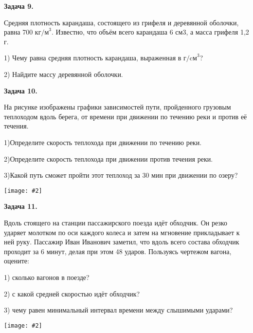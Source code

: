 \documentclass{article}
\newcommand{\pdt}[1]{
	\par
	\begin{minipage}{.95\linewidth}
	\setlength{\parindent}{2em}
	{#1}
	\end{minipage}
	\linebreak
}
\newcommand{\pdtpr}[4]{
	\par
	\begin{minipage}{#3\linewidth}
	\setlength{\parindent}{2em}
	{#1}
	\end{minipage}
	\begin{minipage}{#4\linewidth}
	{\texttt{[image: \#2]}}
	\end{minipage}
	\linebreak
}
\newcommand{\pdtpb}[2]{
	\par
	\begin{minipage}{.95\linewidth}
	\setlength{\parindent}{2em}
	{#1}
	\end{minipage}
	\linebreak
	\begin{minipage}{.95\linewidth}
	{\texttt{[image: \#2]}}
	\end{minipage}
	\linebreak
}
\begin{document}
\pdt{
\Large\textbf{Задача 9.}
{Средняя плотность карандаша, состоящего из грифеля и деревянной оболочки, равна 700 $\text{кг/м}^3$. Известно, что объём всего карандаша 6 см3, а масса грифеля 1,2 г.

1) Чему равна средняя плотность карандаша, выраженная в $\text{г/cм}^3$?

2) Найдите массу деревянной оболочки.}}

\pdtpr{
\Large\textbf{Задача 10.}
{На рисунке изображены графики зависимостей пути, пройденного грузовым теплоходом вдоль берега, от времени при движении по течению реки и против её течения.

1)Определите скорость теплохода при движении по течению реки.

2)Определите скорость теплохода при движении против течения реки.

3)Какой путь сможет пройти этот теплоход за 30 мин при движении по озеру?
}
}{parahod.png}{.55}{.4}

\pdtpb{\Large\textbf{Задача 11.}
{Вдоль стоящего на станции пассажирского поезда идёт обходчик. Он резко ударяет молотком по оси каждого колеса и затем на мгновение прикладывает к ней руку. Пассажир Иван Иванович заметил, что вдоль всего состава обходчик проходит за 6 минут, делая при этом 48 ударов. Пользуясь чертежом вагона, оцените:

1) сколько вагонов в поезде?

2) с какой средней скоростью идёт обходчик?

3) чему равен минимальный интервал времени между слышимыми ударами?}
}
{vagon.png}
\end{document}
